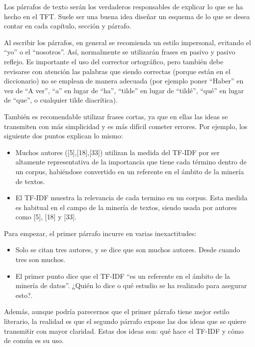 \documentclass[12pt,spanish,chapterprefix, numbers=noenddot]{book}
\numberwithin{equation}{section}
\numberwithin{figure}{section}
\begin{document}
    Los párrafos de texto serán los verdaderos responsables
    de explicar lo que se ha hecho en el TFT. Suele ser una buena idea
    diseñar un esquema de lo que se desea contar en cada capítulo, sección
    y párrafo.

    Al escribir los párrafos, en general se recomienda un estilo impersonal,
    evitando el ``yo'' o el ``nosotros''. Así, normalmente se utilizarán
    frases en pasivo y pasivo reflejo. Es importante el uso del corrector
    ortográfico, pero también debe revisarse con atención las palabras
    que siendo correctas (porque están en el diccionario) no se emplean
    de manera adecuada (por ejemplo poner ``Haber'' en vez de ``A ver'',
    ``a'' en lugar de ``ha'', ``tilde'' en lugar de ``tildé'',
    ``qué'' en lugar de ``que'', o cualquier tilde diacrítica).

    También es recomendable utilizar frases cortas, ya que en ellas las
    ideas se transmiten con más simplicidad y es más difícil cometer errores.
    Por ejemplo, los siguiente dos puntos explican lo mismo:
    \begin{itemize}
        \item Muchos autores ({[}5{]},{[}18{]},{[}33{]}) utilizan la medida del
        TF-IDF por ser altamente representativa de la importancia que tiene
        cada término dentro de un corpus, habiéndose convertido en un referente
        en el ámbito de la minería de textos.
        \item El TF-IDF muestra la relevancia de cada termino en un corpus. Esta
        medida es habitual en el campo de la minería de textos, siendo usada
        por autores como {[}5{]}, {[}18{]} y {[}33{]}.
    \end{itemize}
    Para empezar, el primer párrafo incurre en varias inexactitudes:
    \begin{itemize}
        \item Solo se citan tres autores, y se dice que son muchos autores. Desde
        cuando tres son muchos.
        \item El primer punto dice que el TF-IDF ``es un referente en el ámbito
        de la minería de datos''. ¿Quién lo dice o qué estudio se ha realizado
        para asegurar esto?.
    \end{itemize}
    Además, aunque podría parecernos que el primer párrafo tiene mejor
    estilo literario, la realidad es que el segundo párrafo expone las
    dos ideas que se quiere transmitir con mayor claridad. Estas dos ideas
    son: qué hace el TF-IDF y cómo de común es su uso.
\end{document}
